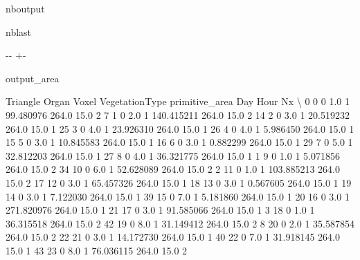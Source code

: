 \documentclass[letterpaper,10pt,english]{sphinxmanual}
\begin{document}
\begin{sphinxuseclass}{nboutput}
\begin{sphinxuseclass}{nblast}
{

\kern-\sphinxverbatimsmallskipamount\kern-\baselineskip
\kern+\FrameHeightAdjust\kern-\fboxrule
\vspace{\nbsphinxcodecellspacing}

\begin{sphinxuseclass}{output_area}
\begin{sphinxuseclass}{}


\begin{sphinxVerbatim}[commandchars=\\\{\}]
    Triangle  Organ  Voxel  VegetationType  primitive\_area    Day  Hour  Nx  \textbackslash{}
0          0      0    1.0               1       99.480976  264.0  15.0   2
7          1      0    2.0               1      140.415211  264.0  15.0   2
14         2      0    3.0               1       20.519232  264.0  15.0   1
25         3      0    4.0               1       23.926310  264.0  15.0   1
26         4      0    4.0               1        5.986450  264.0  15.0   1
15         5      0    3.0               1       10.845583  264.0  15.0   1
16         6      0    3.0               1        0.882299  264.0  15.0   1
29         7      0    5.0               1       32.812203  264.0  15.0   1
27         8      0    4.0               1       36.321775  264.0  15.0   1
1          9      0    1.0               1        5.071856  264.0  15.0   2
34        10      0    6.0               1       52.628089  264.0  15.0   2
2         11      0    1.0               1      103.885213  264.0  15.0   2
17        12      0    3.0               1       65.457326  264.0  15.0   1
18        13      0    3.0               1        0.567605  264.0  15.0   1
19        14      0    3.0               1        7.122030  264.0  15.0   1
39        15      0    7.0               1        5.181860  264.0  15.0   1
20        16      0    3.0               1      271.820976  264.0  15.0   1
21        17      0    3.0               1       91.585066  264.0  15.0   1
3         18      0    1.0               1       36.315518  264.0  15.0   2
42        19      0    8.0               1       31.149412  264.0  15.0   2
8         20      0    2.0               1       35.587854  264.0  15.0   2
22        21      0    3.0               1       14.172730  264.0  15.0   1
40        22      0    7.0               1       31.918145  264.0  15.0   1
43        23      0    8.0               1       76.036115  264.0  15.0   2

\end{sphinxVerbatim}
\end{sphinxuseclass}
\end{sphinxuseclass}}
\end{sphinxuseclass}
\end{sphinxuseclass}
\end{document}

